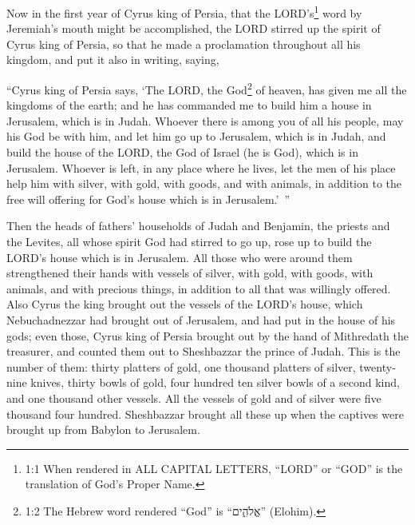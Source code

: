 







\vspace{-1.36in}



\mychapter{} \myverse*{}Now in the first year of Cyrus king of Persia, that the LORD’s\footnote{1:1 When rendered in ALL CAPITAL LETTERS, “LORD” or “GOD” is the translation of God’s Proper Name.}
word by Jeremiah’s mouth might be accomplished, the LORD stirred up the spirit of Cyrus king of Persia,
so that he made a proclamation throughout all his kingdom, and put it also in writing, saying,

\myverse{}“Cyrus king of Persia says, ‘The LORD, the God\footnote{1:2 The Hebrew word rendered “God” is “אֱלֹהִ֑ים” (Elohim).} of heaven, has given
me all the kingdoms of the earth; and he has commanded me to build him a house in Jerusalem, which is
in Judah.
\myverse{}Whoever there is among you of all his people, may his God be with him, and let
him go up to Jerusalem, which is in Judah, and build the house of the LORD, the God of Israel (he is God),
which is in Jerusalem.
\myverse{}Whoever is left, in any place where he lives, let the men of his place help
him with silver, with gold, with goods, and with animals, in addition to the free will offering for God’s
house which is in Jerusalem.’ ”

\myverse{}Then the heads of fathers’ households of Judah and Benjamin, the
priests and the Levites, all whose spirit God had stirred to go up, rose up to build the LORD’s house
which is in Jerusalem.
\myverse{}All those who were around them strengthened their hands with vessels of silver,
with gold, with goods, with animals, and with precious things, in addition to all that was willingly offered.
\myverse{}Also Cyrus the king brought out the vessels of the LORD’s house, which Nebuchadnezzar
had brought out of Jerusalem, and had put in the house of his gods;
\myverse{}even those, Cyrus king of Persia brought out by the hand of Mithredath the treasurer,
and counted them out to Sheshbazzar the prince of Judah.
\myverse{}This is the number of them: thirty platters of gold, one thousand platters of
silver, twenty-nine knives,
\myverse{}thirty bowls of gold, four hundred ten silver bowls of a second kind, and
one thousand other vessels.
\myverse{}All the vessels of gold and of silver were five thousand four hundred. Sheshbazzar
brought all these up when the captives were brought up from Babylon to Jerusalem.


